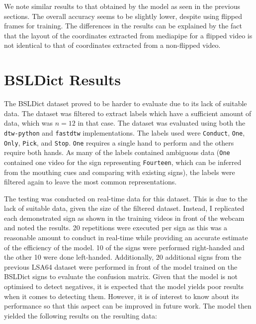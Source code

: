 \documentclass[final,rdr32.tex]{subfiles}
\begin{document}
We note similar results to that obtained by the model as seen in the previous sections. The overall accuracy seems to be slightly lower, despite using flipped frames for training. The differences in the results can be explained by the fact that the layout of the coordinates extracted from mediapipe for a flipped video is not identical to that of coordinates extracted from a non-flipped video.

\section{BSLDict Results}
\label{sec:bsldictresults}

The BSLDict dataset proved to be harder to evaluate due to its lack of suitable data. The dataset was filtered to extract labels which have a sufficient amount of data, which was $n=12$ in that case. The dataset was evaluated using both the \verb|dtw-python| and \verb|fastdtw| implementations. The labels used were \verb|Conduct|, \verb|One|, \verb|Only|, \verb|Pick|, and \verb|Stop|. \verb|One| requires a single hand to perform and the others require both hands. As many of the labels contained ambiguous data (\verb|One| contained one video for the sign representing \verb|Fourteen|, which can be inferred from the mouthing cues and comparing with existing signs), the labels were filtered again to leave the most common representations.

The testing was conducted on real-time data for this dataset. This is due to the lack of suitable data, given the size of the filtered dataset. Instead, I replicated each demonstrated sign as shown in the training videos in front of the webcam and noted the results. 20 repetitions were executed per sign as this was a reasonable amount to conduct in real-time while providing an accurate estimate of the efficiency of the model. 10 of the signs were performed right-handed and the other 10 were done left-handed. Additionally, 20 additional signs from the previous LSA64 dataset were performed in front of the model trained on the BSLDict signs to evaluate the confusion matrix. Given that the model is not optimised to detect negatives, it is expected that the model yields poor results when it comes to detecting them. However, it is of interest to know about its performance so that this aspect can be improved in future work. The model then yielded the following results on the resulting data:
\end{document}
